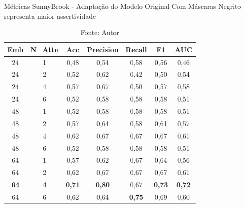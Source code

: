 \begin{table}[htbp]
\centering
\caption{Métricas SunnyBrook - Adaptação do Modelo Original Com Máscaras
\newline Negrito representa maior assertividade}
\begin{tabular}{ccccccc}
\toprule
\textbf{Emb} & \textbf{N\_Attn} & \textbf{Acc} & \textbf{Precision} & \textbf{Recall} & \textbf{F1} & \textbf{AUC} \\
\midrule
24 & 1 & 0,48 & 0,54 & 0,58 & 0,56 & 0,46 \\
24 & 2 & 0,52 & 0,62 & 0,42 & 0,50 & 0,54 \\
24 & 4 & 0,57 & 0,67 & 0,50 & 0,57 & 0,58 \\
24 & 6 & 0,52 & 0,58 & 0,58 & 0,58 & 0,51 \\
48 & 1 & 0,52 & 0,58 & 0,58 & 0,58 & 0,51 \\
48 & 2 & 0,57 & 0,64 & 0,58 & 0,61 & 0,57 \\
48 & 4 & 0,62 & 0,67 & 0,67 & 0,67 & 0,61 \\
48 & 6 & 0,52 & 0,58 & 0,58 & 0,58 & 0,51 \\
64 & 1 & 0,57 & 0,62 & 0,67 & 0,64 & 0,56 \\
64 & 2 & 0,62 & 0,67 & 0,67 & 0,67 & 0,61 \\
\textbf{64} & \textbf{4} & \textbf{0,71} & \textbf{0,80} & 0,67 & \textbf{0,73} & \textbf{0,72} \\
64 & 6 & 0,62 & 0,64 & \textbf{0,75} & 0,69 & 0,60 \\
\bottomrule
\end{tabular}
\caption*{Fonte: Autor}
\label{tab:metrics_sunny_orig_mask}
\end{table}


